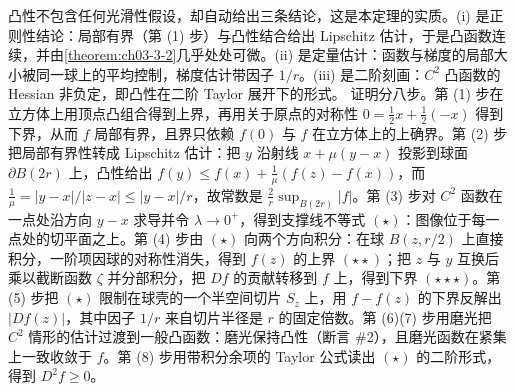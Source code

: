 \documentclass[../../main.tex]{subfiles}%
\begin{document}
\begin{remark}\label{remark:ch06-thm-6-7-动机}
凸性不包含任何光滑性假设，却自动给出三条结论，这是本定理的实质。(i) 是正则性结论：局部有界（第 (1) 步）与凸性结合给出 Lipschitz 估计，于是凸函数连续，并由\cref{theorem:ch03-3-2}几乎处处可微。(ii) 是定量估计：函数与梯度的局部大小被同一球上的平均控制，梯度估计带因子 $1/r$。(iii) 是二阶刻画：$C^{2}$ 凸函数的 Hessian 非负定，即凸性在二阶 Taylor 展开下的形式。%
证明分八步。第 (1) 步在立方体上用顶点凸组合得到上界，再用关于原点的对称性 $0=\frac12x+\frac12(-x)$ 得到下界，从而 $f$ 局部有界，且界只依赖 $f(0)$ 与 $f$ 在立方体上的上确界。第 (2) 步把局部有界性转成 Lipschitz 估计：把 $y$ 沿射线 $x+\mu(y-x)$ 投影到球面 $\partial B(2r)$ 上，凸性给出 $f(y)\leqslant f(x)+\frac1\mu(f(z)-f(x))$，而 $\frac1\mu=\lvert y-x\rvert/\lvert z-x\rvert\leqslant\lvert y-x\rvert/r$，故常数是 $\frac2r\sup_{B(2r)}\lvert f\rvert$。第 (3) 步对 $C^{2}$ 函数在一点处沿方向 $y-x$ 求导并令 $\lambda\to0^{+}$，得到支撑线不等式 $(\star)$：图像位于每一点处的切平面之上。第 (4) 步由 $(\star)$ 向两个方向积分：在球 $B(z,r/2)$ 上直接积分，一阶项因球的对称性消失，得到 $f(z)$ 的上界 $(\star\star)$；把 $z$ 与 $y$ 互换后乘以截断函数 $\zeta$ 并分部积分，把 $Df$ 的贡献转移到 $f$ 上，得到下界 $(\star\star\star)$。第 (5) 步把 $(\star)$ 限制在球壳的一个半空间切片 $S_z$ 上，用 $f-f(z)$ 的下界反解出 $\lvert Df(z)\rvert$，其中因子 $1/r$ 来自切片半径是 $r$ 的固定倍数。第 (6)(7) 步用磨光把 $C^{2}$ 情形的估计过渡到一般凸函数：磨光保持凸性（断言 \#2），且磨光函数在紧集上一致收敛于 $f$。第 (8) 步用带积分余项的 Taylor 公式读出 $(\star)$ 的二阶形式，得到 $D^{2}f\geqslant0$。
\end{remark}
\end{document}
